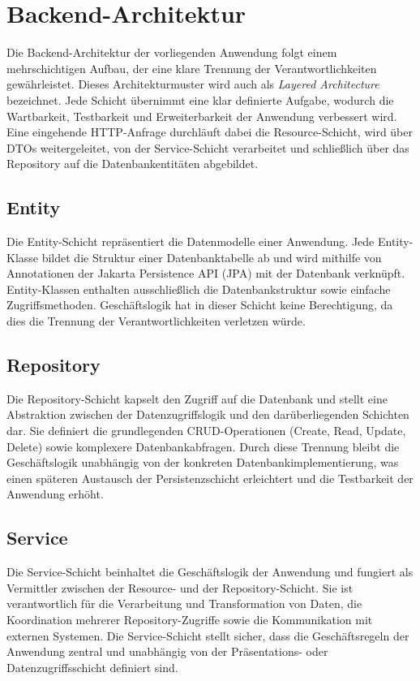 \section{Backend-Architektur}

Die Backend-Architektur der vorliegenden Anwendung folgt einem mehrschichtigen Aufbau,
der eine klare Trennung der Verantwortlichkeiten gewährleistet. Dieses Architekturmuster
wird auch als \textit{Layered Architecture} bezeichnet. Jede Schicht übernimmt eine
klar definierte Aufgabe, wodurch die Wartbarkeit, Testbarkeit und Erweiterbarkeit
der Anwendung verbessert wird. Eine eingehende HTTP-Anfrage durchläuft dabei die
Resource-Schicht, wird über DTOs weitergeleitet, von der Service-Schicht verarbeitet
und schließlich über das Repository auf die Datenbankentitäten abgebildet.

\subsection{Entity}

Die Entity-Schicht repräsentiert die Datenmodelle einer Anwendung. Jede Entity-Klasse
bildet die Struktur einer Datenbanktabelle ab und wird mithilfe von Annotationen der
Jakarta Persistence API (JPA) mit der Datenbank verknüpft. Entity-Klassen enthalten
ausschließlich die Datenbankstruktur sowie einfache Zugriffsmethoden. Geschäftslogik
hat in dieser Schicht keine Berechtigung, da dies die Trennung der Verantwortlichkeiten
verletzen würde.

\subsection{Repository}

Die Repository-Schicht kapselt den Zugriff auf die Datenbank und stellt eine
Abstraktion zwischen der Datenzugriffslogik und den darüberliegenden Schichten dar.
Sie definiert die grundlegenden CRUD-Operationen (Create, Read, Update, Delete) sowie
komplexere Datenbankabfragen. Durch diese Trennung bleibt die Geschäftslogik
unabhängig von der konkreten Datenbankimplementierung, was einen späteren Austausch
der Persistenzschicht erleichtert und die Testbarkeit der Anwendung erhöht.

\subsection{Service}

Die Service-Schicht beinhaltet die Geschäftslogik der Anwendung und fungiert als
Vermittler zwischen der Resource- und der Repository-Schicht. Sie ist verantwortlich
für die Verarbeitung und Transformation von Daten, die Koordination mehrerer
Repository-Zugriffe sowie die Kommunikation mit externen Systemen. Die Service-Schicht
stellt sicher, dass die Geschäftsregeln der Anwendung zentral und unabhängig von
der Präsentations- oder Datenzugriffsschicht definiert sind.

